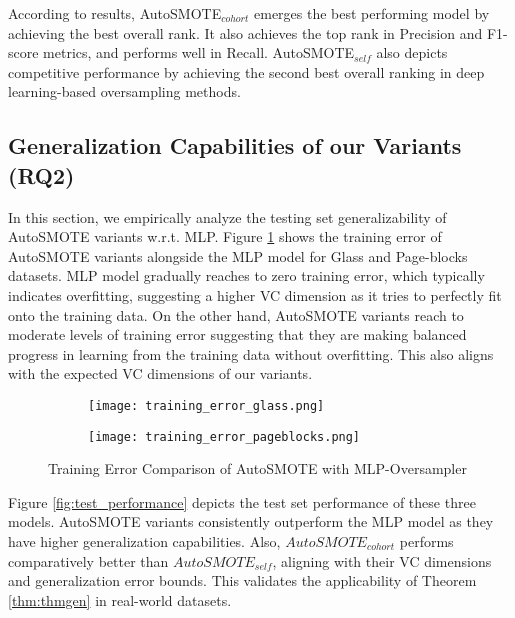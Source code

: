 According to results, AutoSMOTE$_{cohort}$ emerges the best performing model by achieving the best overall rank. It also achieves the top rank in Precision and F1-score metrics, and performs well in Recall. AutoSMOTE$_{self}$ also depicts competitive performance by achieving the second best overall ranking in deep learning-based oversampling methods.


\subsection{Generalization Capabilities of our Variants (RQ2)} \label{sec:generalization_perfformance}

In this section, we empirically analyze the testing set generalizability of AutoSMOTE variants w.r.t. MLP. Figure \ref{fig:training_error} shows the training error of AutoSMOTE variants alongside the MLP model for Glass and Page-blocks datasets. MLP model gradually reaches to zero training error, which typically indicates overfitting, suggesting a higher VC dimension as it tries to perfectly fit onto the training data. On the other hand, AutoSMOTE variants reach to moderate levels of training error suggesting that they are making balanced progress in learning from the training data without overfitting. This also aligns with the expected VC dimensions of our variants.


\begin{figure}[H]
    \centering
    \begin{subfigure}{1\textwidth}  %
        \centering
        \texttt{[image: training\_error\_glass.png]}
    \end{subfigure}
    \hfill
    \begin{subfigure}{1\textwidth}  %
        \centering
        \texttt{[image: training\_error\_pageblocks.png]}
    \end{subfigure}
    
    \caption{Training Error Comparison of AutoSMOTE with MLP-Oversampler}
    \label{fig:training_error}
\end{figure}

Figure \ref{fig:test_performance} depicts the test set performance of these three models. AutoSMOTE variants consistently outperform the MLP model as they have higher generalization capabilities. Also, $AutoSMOTE_{cohort}$ performs comparatively better than $AutoSMOTE_{self}$, aligning with their VC dimensions and generalization error bounds. This validates the applicability of Theorem \ref{thm:thmgen} in real-world datasets.

